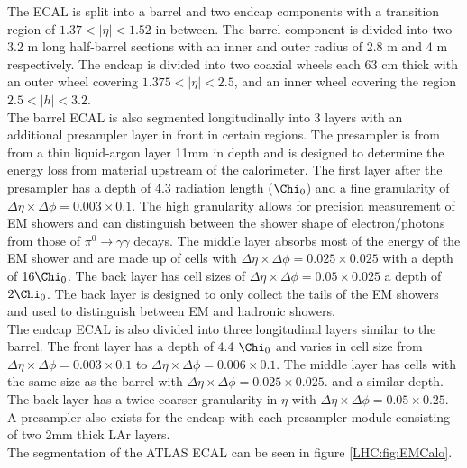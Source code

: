 \indent The ECAL is split into a barrel and two endcap components with a transition region of $1.37 < |\eta| < 1.52$ in between.  The barrel component is divided into two 3.2 m long half-barrel sections with an inner and outer radius of 2.8 m and 4 m respectively.  The endcap is divided into two coaxial wheels each 63 cm thick with an outer wheel covering $1.375 < |\eta| < 2.5$, and an inner wheel covering the region $2.5 < |h| < 3.2$. \\

\indent The barrel ECAL is also segmented longitudinally into 3 layers with an additional presampler layer in front in certain regions.  The presampler is from from a thin liquid-argon layer 11mm in depth and is designed to determine the energy loss from material upstream of the calorimeter.  The first layer after the presampler has a depth of 4.3 radiation length ($\Chi_0$) and a fine granularity of $\Delta\eta \times \Delta\phi = 0.003 \times 0.1$.  The high granularity allows for precision measurement of EM showers and can distinguish between the shower shape of electron/photons from those of $\pi^0\rightarrow \gamma\gamma$ decays.  The middle layer absorbs most of the energy of the EM shower and are made up of cells with $\Delta\eta \times \Delta\phi = 0.025 \times 0.025$ with a depth of $16 \Chi_0$.  The back layer has cell sizes of $\Delta\eta \times \Delta\phi = 0.05 \times 0.025$ a depth of $2 \Chi_0$.  The back layer is designed to only collect the tails of the EM showers and used to distinguish between EM and hadronic showers.  \\

\indent The endcap ECAL is also divided into three longitudinal layers similar to the barrel.  The front layer has a depth of 4.4 $\Chi_0$ and varies in cell size from $\Delta\eta \times \Delta\phi = 0.003 \times 0.1$ to $\Delta\eta \times \Delta\phi = 0.006 \times 0.1$. The middle layer has cells with the same size as the barrel with $\Delta\eta \times \Delta\phi = 0.025 \times 0.025$. and a similar depth. The back layer has a twice coarser granularity in $\eta$ with $\Delta\eta \times \Delta\phi = 0.05 \times 0.25$.  A presampler also exists for the endcap with each presampler module consisting of two 2mm thick LAr layers. \\

\indent The segmentation of the ATLAS ECAL can be seen in figure \ref{LHC:fig:EMCalo}. \\

